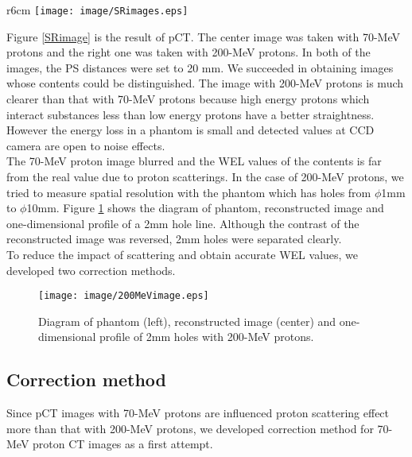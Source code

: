 \documentclass[preprint,3pt]{elsarticle} %
\begin{document}
{\begin{wrapfigure}{r}{6cm}%
\vspace*{-\intextsep} %
\texttt{[image: image/SRimages.eps]}
\caption{Diagram of phantom (left), reconstructed image with 70-MeV protons (center) and 200 MeV proton (right). }
\label{SRimage}
\end{wrapfigure}
	Figure \ref{SRimage} is the result of pCT. The center image was taken with 70-MeV protons and the right one was taken with 200-MeV protons. In both of the images, the PS distances were set to 20 mm. We succeeded in obtaining images whose contents could be distinguished. The image with 200-MeV protons is much clearer than that with 70-MeV protons because high energy protons which interact substances less than low energy protons have a better straightness. However the energy loss in a phantom is small and detected values at CCD camera are open to noise effects. \\
	The 70-MeV proton image blurred and the WEL values of the contents is far from the real value due to proton scatterings. In the case of 200-MeV protons, we tried  to measure spatial resolution with the phantom which has holes from $\phi$1mm to $\phi$10mm. Figure \ref{200MeV} shows the diagram of phantom, reconstructed image and one-dimensional profile of a 2mm hole line. Although the contrast of the reconstructed image was reversed, 2mm holes were separated clearly.\\
	To reduce the impact of scattering and obtain accurate WEL values, we developed two correction methods.\\
\begin{figure}[H]
\centering
\texttt{[image: image/200MeVimage.eps]}
\caption[Diagram of phantom (left), reconstructed image (center) and one-dimensional profile of 2mm holes with 200-MeV protons. ]{Diagram of phantom (left), reconstructed image (center) and one-dimensional profile of 2mm holes with 200-MeV protons.}
\label{200MeV}
\end{figure}

\subsection{Correction method}
	Since pCT images with 70-MeV protons are influenced proton scattering effect more than that with 200-MeV protons, we developed correction method for 70-MeV proton CT images as a first attempt.\\
}
\end{document}
